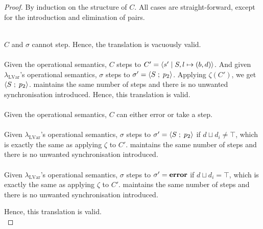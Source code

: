 \documentclass[main.tex]{subfiles}
\begin{document}
\begin{proof}
  By induction on the structure of $C$. All cases are straight-forward, except
  for the introduction and elimination of pairs.

 \\
 $C$ and $\sigma$ cannot step. Hence, the translation is vacuously valid.\\


 \\
  Given the operational semantics, $C$ steps to $C' = \langle {s'}\;\vert\;{S, l \mapsto (b,
    d)} \rangle$.
  And given $\lambda_{\text{LVar}}$'s operational semantics, $\sigma$ steps to
  $\sigma' = \langle {S} \; ; \;{p_2} \rangle$. Applying $\zeta (C')$, we get
  $\langle {S} \; ; \;{p_2} \rangle$. \typedlvar maintains the same number of steps and there is
  no unwanted synchronisation introduced. Hence, this translation is valid. \\


  \\
  Given the operational semantics, $C$ can either error or take a step.\\

     \\
    Given $\lambda_{\text{LVar}}$'s operational semantics, $\sigma$ steps to
    $\sigma' = \langle {S} \; ; \;{p_2} \rangle$ if $d \sqcup d_{i} \neq \top$, which is exactly
    the same as applying $\zeta$ to $C'$. \typedlvar maintains the same number
    of steps and there is no unwanted synchronisation introduced. \\
    

    \\
     Given $\lambda_{\text{LVar}}$'s operational semantics, $\sigma$ steps to
    $\sigma' = \mathbf{error}$ if $d \sqcup d_{i} = \top$, which is exactly
    the same as applying $\zeta$ to $C'$. \typedlvar maintains the same number
    of steps and there is no unwanted synchronisation introduced.

    Hence, this translation is valid. \\ 



\end{proof}
\end{document}
